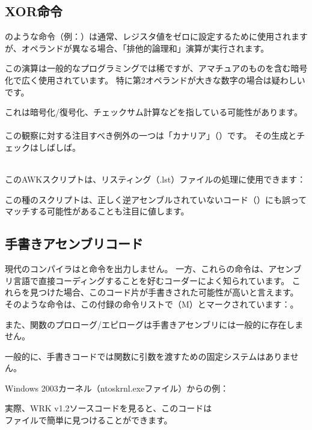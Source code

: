 
\subsection{XOR命令}

のような命令（例：）は通常、レジスタ値をゼロに設定するために使用されますが、オペランドが異なる場合、「排他的論理和」演算が実行されます。

この演算は一般的なプログラミングでは稀ですが、アマチュアのものを含む暗号化で広く使用されています。
特に第2オペランドが大きな数字の場合は疑わしいです。

これは暗号化/復号化、チェックサム計算などを指している可能性があります。\\
\\

この観察に対する注目すべき例外の一つは「カナリア」（）です。
その生成とチェックはしばしば。\\
\\

このAWKスクリプトは、\IDA{}リスティング（.lst）ファイルの処理に使用できます：



この種のスクリプトは、正しく逆アセンブルされていないコード（）にも誤ってマッチする可能性があることも注目に値します。

\subsection{手書きアセンブリコード}


現代のコンパイラはと命令を出力しません。
一方、これらの命令は、アセンブリ言語で直接コーディングすることを好むコーダーによく知られています。
これらを見つけた場合、このコード片が手書きされた可能性が高いと言えます。
そのような命令は、この付録の命令リストで（M）とマークされています：。

\par

また、関数のプロローグ/エピローグは手書きアセンブリには一般的に存在しません。
\par

一般的に、手書きコードでは関数に引数を渡すための固定システムはありません。

\par
Windows 2003カーネル（ntoskrnl.exeファイル）からの例：



実際、\ac{WRK} v1.2ソースコードを見ると、このコードは\\
ファイルで簡単に見つけることができます。